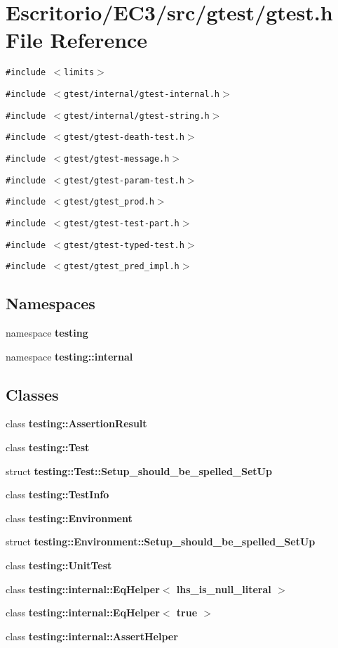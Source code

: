 \section{Escritorio/EC3/src/gtest/gtest.h File Reference}
\label{gtest_8h}
{\tt \#include $<$limits$>$}\par
{\tt \#include $<$gtest/internal/gtest-internal.h$>$}\par
{\tt \#include $<$gtest/internal/gtest-string.h$>$}\par
{\tt \#include $<$gtest/gtest-death-test.h$>$}\par
{\tt \#include $<$gtest/gtest-message.h$>$}\par
{\tt \#include $<$gtest/gtest-param-test.h$>$}\par
{\tt \#include $<$gtest/gtest\_\-prod.h$>$}\par
{\tt \#include $<$gtest/gtest-test-part.h$>$}\par
{\tt \#include $<$gtest/gtest-typed-test.h$>$}\par
{\tt \#include $<$gtest/gtest\_\-pred\_\-impl.h$>$}\par
\subsection*{Namespaces}
\begin{CompactItemize}
\item 
namespace {\bf testing}
\item 
namespace {\bf testing::internal}
\end{CompactItemize}
\subsection*{Classes}
\begin{CompactItemize}
\item 
class {\bf testing::AssertionResult}
\item 
class {\bf testing::Test}
\item 
struct {\bf testing::Test::Setup\_\-should\_\-be\_\-spelled\_\-SetUp}
\item 
class {\bf testing::TestInfo}
\item 
class {\bf testing::Environment}
\item 
struct {\bf testing::Environment::Setup\_\-should\_\-be\_\-spelled\_\-SetUp}
\item 
class {\bf testing::UnitTest}
\item 
class {\bf testing::internal::EqHelper$<$ lhs\_\-is\_\-null\_\-literal $>$}
\item 
class {\bf testing::internal::EqHelper$<$ true $>$}
\item 
class {\bf testing::internal::AssertHelper}
\end{CompactItemize}
